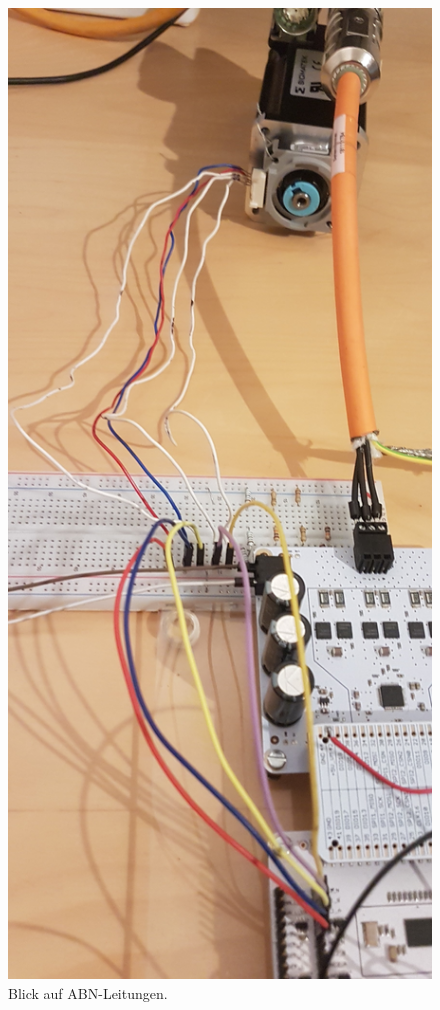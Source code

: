 \begin{figure}[H]
	\centering
	\includegraphics[angle = 270, width=\textwidth]{graphics/4_Antriebskette}
	\caption{Blick auf ABN-Leitungen.}
	\label{fig:4_Antriebskette}
\end{figure}

